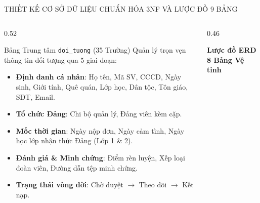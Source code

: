 \documentclass[aspectratio=169, 10pt]{beamer}
\begin{document}
\begin{frame}{THIẾT KẾ CƠ SỞ DỮ LIỆU CHUẨN HÓA 3NF VÀ LƯỢC ĐỒ 9 BẢNG}
  \begin{columns}[T]
    \begin{column}{0.52\textwidth}
      \begin{highlightCard}{Bảng Trung tâm \texttt{doi\_tuong} (35 Trường)}
        \fontsize{6.8pt}{8.2pt}\selectfont
        Quản lý trọn vẹn thông tin đối tượng qua 5 giai đoạn:
        \begin{itemize}
          \setlength{\itemsep}{1pt}
          \item \textbf{Định danh cá nhân}: Họ tên, Mã SV, CCCD, Ngày sinh, Giới tính, Quê quán, Lớp học, Dân tộc, Tôn giáo, SĐT, Email.
          \item \textbf{Tổ chức Đảng}: Chi bộ quản lý, Đảng viên kèm cặp.
          \item \textbf{Mốc thời gian}: Ngày nộp đơn, Ngày cảm tình, Ngày học lớp nhận thức Đảng (Lớp 1 \& 2).
          \item \textbf{Đánh giá \& Minh chứng}: Điểm rèn luyện, Xếp loại đoàn viên, Đường dẫn tệp minh chứng.
          \item \textbf{Trạng thái vòng đời}: Chờ duyệt $\to$ Theo dõi $\to$ Kết nạp.
        \end{itemize}
      \end{highlightCard}
    \end{column}
    \begin{column}{0.46\textwidth}
      \begin{infoCard}
        \textbf{\color{DarkRed}Lược đồ ERD 8 Bảng Vệ tinh}
        \begin{center}
\end{center}
\end{infoCard}
\end{column}
\end{columns}
\end{frame}
\end{document}

